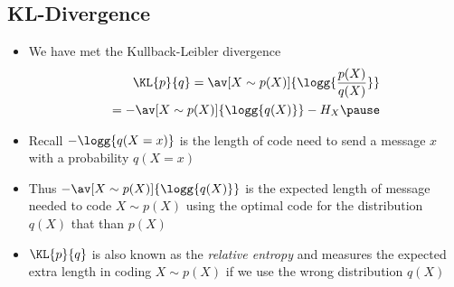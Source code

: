 \Outline %

\begin{slide}
\section[-2]{KL-Divergence}

\begin{PauseHighLight}
  \begin{itemize}
  \item We have met the Kullback-Leibler  divergence
    \begin{align*}
      \KL{p}{q} = \av[X\sim p(X)]{\logg{\frac{p(X)}{q(X)}}} \\
      = -\av[X\sim p(X)]{\logg{q(X)}} - H_X\pause
    \end{align*}
  \item Recall $-\logg{q(X=x)}$ is the length of code need to send a
    message $x$ with a probability $q(X=x)$\pause
  \item  Thus $-\av[X\sim p(X)]{\logg{q(X)}}$ is the expected length of
    message needed to code $X\sim p(X)$ using the optimal code for the
    distribution $q(X)$ that than $p(X)$\pause
  \item $\KL{p}{q}$ is also known as the \emph{relative entropy}
    and measures the expected extra length in coding $X\sim p(X)$ if
    we use the wrong distribution $q(X)$\pause
  \end{itemize}
\end{PauseHighLight}

\end{slide}


